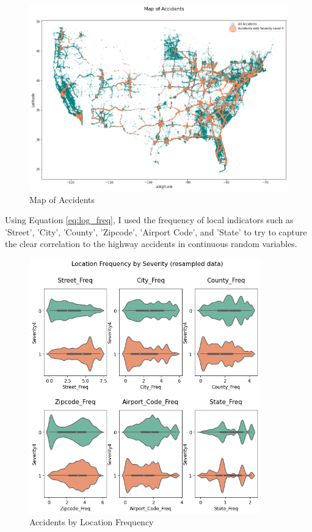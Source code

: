 \begin{figure}[H]
    \centering
    \includegraphics[width=115mm,height=\textheight,keepaspectratio]{images/map_accidents.png}
    \caption{Map of Accidents}
    \label{fig:map_accidents}
\end{figure}

Using Equation \ref{eq:log_freq}, I used the frequency of local indicators such as 'Street', 'City', 'County', 'Zipcode', 'Airport Code', and 'State' to try to capture the clear correlation to the highway accidents in continuous random variables.

\begin{figure}[H]
    \centering
    \includegraphics[width=100mm,height=\textheight,keepaspectratio]{images/violin_loc.png}
    \caption{Accidents by Location Frequency}
    \label{fig:violin_loc}
\end{figure}

